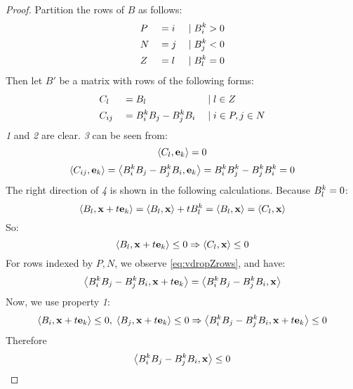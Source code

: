 \begin{proof}
  Partition the rows of $B$ as follows:
  \begin{alignat*}{3}
  &P &&= i &\;|\; &B^k_i > 0 \\
  &N &&= j &\;|\; &B^k_j < 0 \\
  &Z &&= l &\;|\; &B^k_l = 0
  \end{alignat*}
  Then let $B'$ be a matrix with rows of the following forms:
  \begin{alignat*}{3}
    &C_l    &&= B_l &\;|\; &l \in Z \\
    &C_{ij} &&= B^k_i B_j - B^k_j B_i &\;|\; &i \in P, j \in N
  \end{alignat*}
  \textit{1} and \textit{2} are clear.  \textit{3} can be seen from:
  \[ \left\langle C_l, \mathbf{e}_k \right\rangle = 0 \]
  \begin{equation}\label{eq:vdropZrows}
  \left\langle C_{ij}, \mathbf{e}_k \right\rangle = \left\langle B^k_i B_j - B^k_j B_i, \mathbf{e}_k \right\rangle = B^k_i B^k_j - B^k_j B^k_i = 0
  \end{equation}
  The right direction of \textit{4} is shown in the following calculations.  Because $B^k_l = 0$:
  \[ \left\langle B_l, \mathbf{x}+t\mathbf{e}_k \right\rangle = \left\langle B_l, \mathbf{x} \right\rangle + tB^k_l = \left\langle B_l, \mathbf{x} \right\rangle = \left\langle C_l, \mathbf{x} \right\rangle \]
  So:
  \[ \left\langle B_l, \mathbf{x}+t\mathbf{e}_k \right\rangle \leq 0 \Rightarrow \left\langle C_l, \mathbf{x} \right\rangle \leq 0 \]
  For rows indexed by $P,N$, we observe \eqref{eq:vdropZrows}, and have:
  \[ \left\langle B^k_i B_j - B^k_j B_i, \mathbf{x} + t\mathbf{e}_k \right\rangle = \left\langle B^k_i B_j - B^k_j B_i, \mathbf{x} \right\rangle \]
  Now, we use property \textit{1}:
  \[ \left\langle B_i, \mathbf{x}+t\mathbf{e}_k \right\rangle \leq 0,\; \left\langle B_j, \mathbf{x}+t\mathbf{e}_k \right\rangle \leq 0 \Rightarrow 
     \left\langle B^k_i B_j - B^k_j B_i, \mathbf{x} + t\mathbf{e}_k \right\rangle \leq 0\]
  Therefore 
  \[ \left\langle B^k_i B_j - B^k_j B_i, \mathbf{x} \right\rangle \leq 0 \]
     

\end{proof}
